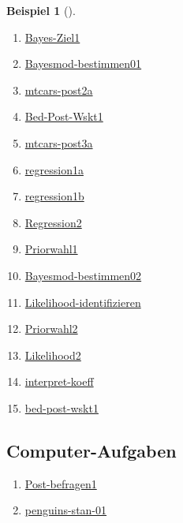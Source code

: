 \documentclass[
  ngerman,
  letterpaper,
  twoside,
  open=any]{scrbook}
\providecommand{\tightlist}{%
  \setlength{\itemsep}{0pt}\setlength{\parskip}{0pt}}\usepackage{longtable,booktabs,array}
\theoremstyle{definition}
\newtheorem{example}{Beispiel}[chapter]
\theoremstyle{plain}
\theoremstyle{definition}
\theoremstyle{definition}
\theoremstyle{remark}
\begin{document}
\begin{example}[]
\begin{enumerate}
\def\labelenumi{\arabic{enumi}.}
\tightlist
\item
  \href{https://datenwerk.netlify.app/posts/bayes-ziel1/bayes-ziel1}{Bayes-Ziel1}
\item
  \href{https://datenwerk.netlify.app/posts/bayesmod-bestimmen01/bayesmod-bestimmen01}{Bayesmod-bestimmen01}
\item
  \href{https://datenwerk.netlify.app/posts/mtcars-post2a/}{mtcars-post2a}
\item
  \href{https://datenwerk.netlify.app/posts/bed-post-wskt1/bed-post-wskt1}{Bed-Post-Wskt1}
\item
  \href{https://datenwerk.netlify.app/posts/mtcars-post3a/}{mtcars-post3a}
\item
  \href{https://datenwerk.netlify.app/posts/regression1a/regression1a.html}{regression1a}
\item
  \href{https://datenwerk.netlify.app/posts/regression1b/regression1b}{regression1b}
\item
  \href{https://datenwerk.netlify.app/posts/regression2/regression2}{Regression2}
\item
  \href{https://datenwerk.netlify.app/posts/priorwahl1/priorwahl1}{Priorwahl1}
\item
  \href{https://datenwerk.netlify.app/posts/bayesmod-bestimmen02/bayesmod-bestimmen02}{Bayesmod-bestimmen02}
\item
  \href{https://datenwerk.netlify.app/posts/likelihood-identifizieren/likelihood-identifizieren}{Likelihood-identifizieren}
\item
  \href{https://datenwerk.netlify.app/posts/priorwahl2/priorwahl2}{Priorwahl2}
\item
  \href{https://datenwerk.netlify.app/posts/likelihood2/likelihood2}{Likelihood2}
\item
  \href{https://datenwerk.netlify.app/posts/interpret-koeff/interpret-koeff}{interpret-koeff}
\item
  \href{https://datenwerk.netlify.app/posts/bed-post-wskt1/bed-post-wskt1}{bed-post-wskt1}
\end{enumerate}

\subsection{Computer-Aufgaben}\label{computer-aufgaben}

\begin{enumerate}
\def\labelenumi{\arabic{enumi}.}
\tightlist
\item
  \href{https://datenwerk.netlify.app/posts/post-befragen1/post-befragen1}{Post-befragen1}
\item
  \href{https://datenwerk.netlify.app/posts/penguins-stan-01/penguins-stan-01.html}{penguins-stan-01}
\end{enumerate}


\end{example}
\end{document}
